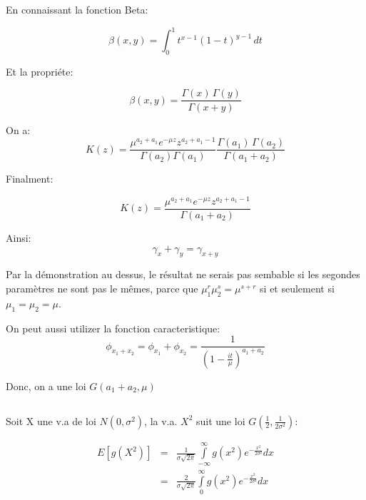\documentclass[a4paper]{article}
\begin{document}
En connaissant la fonction Beta:

\begin{equation}
\mathbb{\beta}(x,y) = \int_0^1t^{x-1}(1-t)^{y-1}\,dt
\end{equation}

Et la propriéte:

\begin{equation}
\beta(x,y)=\frac{\Gamma(x)\,\Gamma(y)}{\Gamma(x+y)}
\end{equation}

On a:
\begin{equation*}
K(z)=\frac{\mu^{a_2+a_1}e^{-\mu z}z^{a_2+a_1-1}}{\Gamma (a_2)\Gamma (a_1)}\frac{\Gamma(a_1)\,\Gamma(a_2)}{\Gamma(a_1+a_2)}
\end{equation*}

Finalment:

\begin{equation}
K(z)=\frac{\mu^{a_2+a_1}e^{-\mu z}z^{a_2+a_1-1}}{\Gamma(a_1+a_2)}
\end{equation}

Ainsi:
\begin{equation*}
\gamma_{x}+\gamma_{y}=\gamma_{x+y}
\end{equation*}

Par la démonstration au dessus, le résultat ne serais pas sembable si les segondes paramètres ne sont pas le mêmes, parce que 
$\mu_{1}^r \mu_{2}^s = \mu^{s+r}$ si et seulement si $\mu_1=\mu_2=\mu$.

On peut aussi utilizer la fonction caracteristique:
\begin{equation}
\phi_{x_1+x_2}=\phi_{x_1}+\phi_{x_2}=\frac{1}{(1-\frac{it}{\mu})^{a_1+a_2}}
\end{equation}

Donc, on a une loi $G(a_1+a_2,\mu)$



\subsection{}

Soit X une v.a de loi $N(0,\sigma^2)$, la v.a. $X^2$ suit une loi $G(\frac{1}{2},\frac{1}{2\sigma^2})$:

\begin{eqnarray*}
E[g(X^2)]&=&\frac{1}{\sigma\sqrt{2\pi}}\int\limits_{-\infty}^\infty g(x^2)e^{-\frac{x^2}{2\sigma²}}dx\\
&=&\frac{2}{\sigma\sqrt{2\pi}}\int\limits_{0}^\infty g(x^2)e^{-\frac{x^2}{2\sigma²}}dx
\end{eqnarray*}
\end{document}

